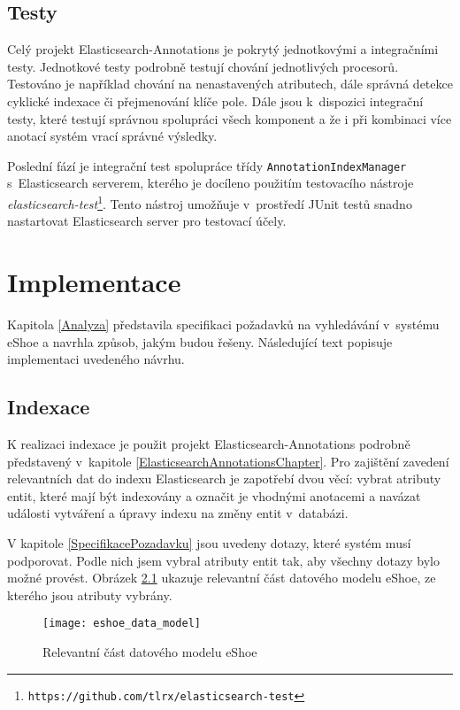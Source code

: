 \documentclass[11pt,oneside]{fithesis2}
\begin{document}
\section{Testy}
\label{ElasticsearchAnnotationsTesty}
Celý projekt Elasticsearch-Annotations je pokrytý jednotkovými a integračními testy. Jednotkové testy podrobně testují chování jednotlivých procesorů. Testováno je například chování na nenastavených atributech, dále správná detekce cyklické indexace či přejmenování klíče pole. Dále jsou k~dispozici integrační testy, které testují správnou spolupráci všech komponent a že i při kombinaci více anotací systém vrací správné výsledky. 

Poslední fází je integrační test spolupráce třídy \texttt{AnnotationIndexManager} s~Elasticsearch serverem, kterého je docíleno použitím testovacího nástroje \emph{elasticsearch-test}\footnote{\texttt{https://github.com/tlrx/elasticsearch-test}}. Tento nástroj umožňuje v~prostředí JUnit testů snadno nastartovat Elasticsearch server pro testovací účely.

\chapter{Implementace}
\label{ImplementaceChapter}
Kapitola \ref{Analyza} představila specifikaci požadavků na vyhledávání v~systému eShoe a navrhla způsob, jakým budou řešeny. Následující text popisuje implementaci uvedeného návrhu.

\section{Indexace}
\label{ImplementaceIndexace}
K realizaci indexace je použit projekt Elasticsearch-Annotations podrobně představený v~kapitole \ref{ElasticsearchAnnotationsChapter}. Pro zajištění zavedení relevantních dat do indexu Elasticsearch je zapotřebí dvou věcí: vybrat atributy entit, které mají být indexovány a označit je vhodnými anotacemi a navázat události vytváření a úpravy indexu na změny entit v~databázi.

V kapitole \ref{SpecifikacePozadavku} jsou uvedeny dotazy, které systém musí podporovat. Podle nich jsem vybral atributy entit tak, aby všechny dotazy bylo možné provést. Obrázek \ref{DatovyModelEshoe} ukazuje relevantní část datového modelu eShoe, ze kterého jsou atributy vybrány.

\begin{figure}[htb]
	\begin{center}
		\texttt{[image: eshoe\_data\_model]}
	\end{center}
	\caption{Relevantní část datového modelu eShoe}	
	\label{DatovyModelEshoe}
\end{figure}
\end{document}
